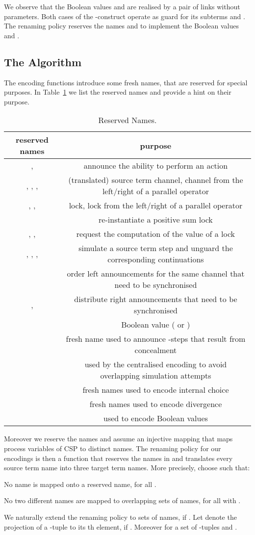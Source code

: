 \documentclass[]{eptcs}
\begin{document}
We observe that the Boolean values  and  are realised by a pair of links without parameters. Both cases of the -construct operate as guard for its subterms  and . The renaming policy  reserves the names  and  to implement the Boolean values  and .

\subsection{The Algorithm}

The encoding functions introduce some fresh names, that are reserved for special purposes. In Table~\ref{tab:resNam} we list the reserved names  and provide a hint on their purpose.
\begin{table}[t]
	\begin{tabular}{|c|c|}
		\hline
		reserved names & purpose\\
		\hline
		,  & announce the ability to perform an action\\
		, , ,  & (translated) source term channel, channel from the left/right of a parallel operator\\
		, ,  & lock, lock from the left/right of a parallel operator\\
		 & re-instantiate a positive sum lock\\
		, ,  & request the computation of the value of a lock\\
		, , ,  & simulate a source term step and unguard the corresponding continuations\\
		 & order left announcements for the same channel that need to be synchronised\\
		,  & distribute right announcements that need to be synchronised\\
		 & Boolean value ( or )\\
		 & fresh name used to announce -steps that result from concealment\\
		 & used by the centralised encoding to avoid overlapping simulation attempts\\
		 & fresh names used to encode internal choice\\
		 & fresh names used to encode divergence\\
		 & used to encode Boolean values\\
		\hline
	\end{tabular}
	\caption{Reserved Names.}
	\label{tab:resNam}
\end{table}
Moreover we reserve the names  and assume an injective mapping  that maps process variables of CSP to distinct names.
The renaming policy  for our encodings is then a function that reserves the names in  and translates every source term name into three target term names. More precisely, choose  such that:
\begin{compactenum}
	\item No name is mapped onto a reserved name, \ie  for all .
	\item No two different names are mapped to overlapping sets of names, \ie  for all  with .
\end{compactenum}
We naturally extend the renaming policy to sets of names, \ie  if .
Let  denote the projection of a -tuple to its th element, if . Moreover  for a set of -tuples  and .
\end{document}
